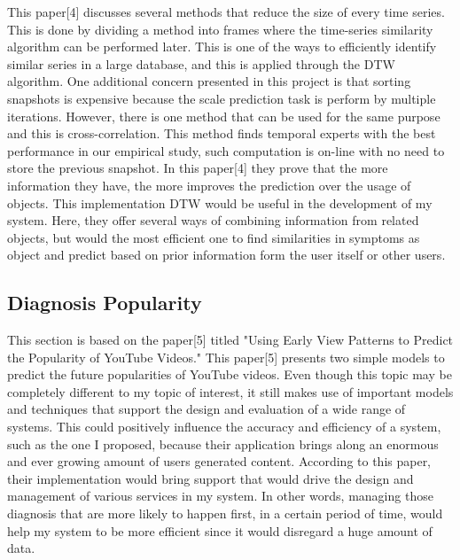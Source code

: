 \documentclass[sts]{sig-alternate}
\begin{document}
		This paper[4] discusses several methods that reduce the size of every time series. This is done 			by dividing a method into frames where the time-series similarity algorithm can be performed 				later. This is one of the ways to efficiently identify similar series in a large database, and 			this is 	applied through the DTW algorithm. One additional concern presented in this project is 			that sorting snapshots is expensive because the scale prediction task is perform by multiple 				iterations. However, there is one method that can be used for the same purpose and this is 				cross-correlation. This method finds temporal experts with the best performance in our empirical 		study, such computation is on-line with no need to store the previous snapshot. In this paper[4] 		they prove that the more information they have, the more improves the prediction over the usage 			of objects. This implementation DTW would be useful in the development of my system. Here, they 			offer several ways of combining information from related objects, but would the most efficient 			one to find similarities in symptoms as object and predict based on prior information form the 			user itself or other users.\newline
	
	\subsection{Diagnosis Popularity}
		\label{Diagnosis Popularity}
	
		This section is based on the paper[5] titled "Using Early View Patterns to Predict the 					Popularity of YouTube Videos." This paper[5] presents two simple models to predict the future 			popularities of 	YouTube 	videos. Even though this topic may be completely different to my topic 			of interest, it still makes use of important models and techniques that support the design and 			evaluation of a wide range of systems. This could positively influence the accuracy and 					efficiency of a system, such as the one I proposed, because their application brings along an 			enormous and ever growing amount of users generated content. According to this paper, their 				implementation would bring support that would drive the design and management of various 					services in my system. In other words, managing those diagnosis that are more likely to happen 			first, in a certain period of time, would help my system to be more efficient since it would 				disregard a huge amount of data.	
\end{document}
